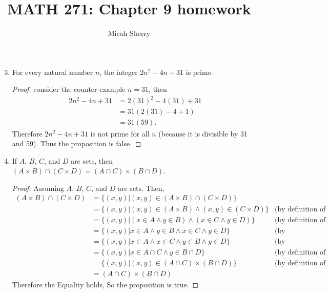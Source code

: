 \documentclass{article}
\title{MATH 271: Chapter 9 homework}
\author{Micah Sherry}
\newcommand{\nitem}[1] %
{
	\setcounter{enumi}{#1}
	\addtocounter{enumi}{-1}
	\item
}
\begin{document}
	\maketitle
	
	\begin{enumerate}
		\nitem{2} For every natural number $n$, the integer $2n^2-4n+31$ is prime.
		\begin{proof}
			consider the counter-example $n = 31 $, then 
			\begin{align*}
				2n^2-4n+31 &= 2(31)^2-4(31)+31\\
				&= 31(2(31)-4+1)\\
				&= 31(59).
			\end{align*}
			Therefore $2n^2-4n+31$ is not prime for all $n$ (because it is divisible by 31 and 59). Thus the proposition is false.
		\end{proof}
		
		\nitem{6} If $A$, $B$, $C$, and $D$ are sets, then $(A \times B)\cap(C \times D)=(A \cap C) \times (B \cap D)$.
		\begin{proof}
			Assuming $A$, $B$, $C$, and $D$ are sets. Then,
			\begin{align*}
				(A \times B)\cap(C \times D) &= \{(x,y)| (x,y) \in (A \times B)\cap(C \times D)\}\\
				&= \{(x,y)| (x,y) \in (A \times B) \wedge (x,y) \in (C \times D)\} 
				& \text{(by definition of intersection)}\\
				&= \{(x,y)| (x \in A \wedge y \in B) \wedge (x \in C \wedge y \in D)\} 
				& \text{(by definition of Cartesian product)}\\
				&= \{(x,y)| x \in A \wedge y \in B \wedge x \in C \wedge y \in D\} 
				& \text{(by Associativity)}\\
				&= \{(x,y)| x \in A \wedge x \in C \wedge y \in B \wedge y \in D\} 
				& \text{(by Commutativity)}\\
				&= \{(x,y)| x \in A \cap C \wedge y \in B \cap D\}
				& \text{(by definition of intersection)}\\
				&= \{(x,y)| (x,y) \in (A \cap C) \times (B \cap D) \}
				& \text{(by definition of Cartesian product)}\\
				&=	(A \cap C) \times (B \cap D)
			\end{align*}
			Therefore the Equality holds, So the proposition is true.
		\end{proof}
		

\end{enumerate}
\end{document}
